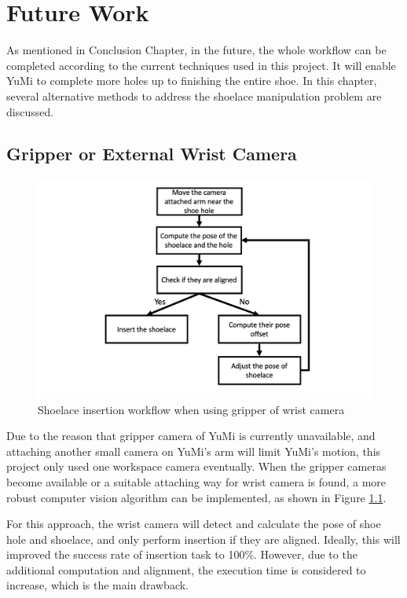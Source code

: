 \chapter{Future Work}
As mentioned in Conclusion Chapter, in the future, the whole workflow can be completed according to the current  techniques used in this project. It will enable YuMi to complete more holes up to finishing the entire shoe. In this chapter, several alternative methods to address the shoelace manipulation problem are discussed. 


\section{Gripper or External Wrist Camera} \label{futurecamera}

\begin{figure}[H]
\centering
\includegraphics[width = 0.8\columnwidth]{Futurework/feedbackcamera.png}
\caption{Shoelace insertion workflow when using gripper of wrist camera}
\label{feedbackcamera}
\end{figure}
Due to the reason that gripper camera of YuMi is currently unavailable, and attaching another small camera on YuMi's arm will limit YuMi's motion, this project only used one workspace camera eventually. When the gripper cameras become available or a suitable attaching way for wrist camera is found, a more robust computer vision algorithm can be implemented, as shown in Figure \ref{feedbackcamera}.

For this approach, the wrist camera will detect and calculate the pose of shoe hole and shoelace, and only perform insertion if they are aligned. Ideally, this will improved the success rate of insertion task to 100\%. However, due to the additional computation and alignment, the execution time is considered to increase, which is the main drawback. 

